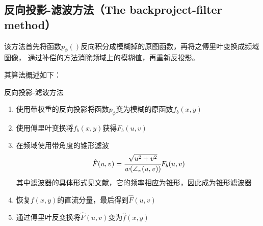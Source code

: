 \subsection{反向投影-滤波方法（The backproject-filter method）}
该方法首先将函数$p_\phi()$反向积分成模糊掉的原图函数，再将之傅里叶变换成频域图像，
通过补偿的方法消除频域上的模糊值，再重新反投影。\cite{smith1973image}

其算法概述如下：
\begin{algo}
反向投影-滤波方法
\begin{enumerate}
\item{使用带权重的反向投影将函数$p_\phi$变为模糊的原函数$f_b(x,y)$}
\item{使用傅里叶变换将$f_b(x,y)$获得$F_b(u,v)$}
\item{在频域使用带角度的锥形滤波
\begin{equation*}
\hat{F}(u,v)=\cfrac{\sqrt{u^2+v^2}}{w(\angle_\pi(u,v))}F_b(u,v)
\end{equation*}
其中滤波器的具体形式见文献\cite{smith1973image}，它的频率相应为锥形，因此成为锥形滤波器}
\item{恢复$f(x,y)$的直流分量，最后得到$\hat{F}(u,v)$}
\item{通过傅里叶反变换将$\hat{F}(u,v)$变为$\hat{f}(x,y)$}
\end{enumerate}
\end{algo}

